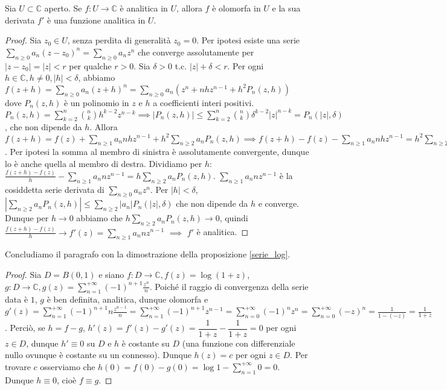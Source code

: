 \begin{thm}
  Sia $U \subset \mathbb{C}$ aperto. Se $f:U \longrightarrow \mathbb{C}$ è analitica in $U$, allora $f$ è olomorfa in $U$ e la sua derivata $f'$ è una funzione analitica in $U$.
\end{thm}

\begin{proof}
  Sia $z_0 \in U$, senza perdita di generalità $z_0=0$. Per ipotesi esiste una serie $\displaystyle \sum_{n \ge 0} a_n(z-z_0)^n=\sum_{n \ge 0} a_nz^n$ che converge assolutamente per $|z-z_0|=|z|<r$ per qualche $r>0$. Sia $\delta>0$ t.c. $|z|+\delta<r$.
  Per ogni $h \in \mathbb{C}, h\not=0, |h|<\delta$, abbiamo $\displaystyle f(z+h)=\sum_{n \ge 0} a_n(z+h)^n=\sum_{n \ge 0} a_n(z^n+nhz^{n-1}+h^2P_n(z, h))$ dove $P_n(z, h)$ è un polinomio in $z$ e $h$ a coefficienti interi positivi.
  $\displaystyle P_n(z, h)=\sum_{k=2}^n \binom{n}{k}h^{k-2}z^{n-k} \implies |P_n(z, h)| \le \sum_{k=2}^n \binom{n}{k} \delta^{k-2}|z|^{n-k}=P_n(|z|, \delta)$, che non dipende da $h$.
  Allora $\displaystyle f(z+h)=f(z)+\sum_{n \ge 1} a_nnhz^{n-1}+h^2\sum_{n \ge 2}a_nP_n(z, h) \implies f(z+h)-f(z)-\sum_{n \ge 1} a_nnhz^{n-1}=h^2\sum_{n \ge 2} a_nP_n(z, h)$. Per ipotesi la somma al membro di sinistra è assolutamente convergente, dunque lo è anche quella al membro di destra.
  Dividiamo per $h$: $\displaystyle \frac{f(z+h)-f(z)}{h}-\sum_{n \ge 1}a_nnz^{n-1}=h\sum_{n \ge 2} a_nP_n(z, h)$. $\displaystyle \sum_{n \ge 1}a_nnz^{n-1}$ è la cosiddetta serie derivata di $\displaystyle \sum_{n \ge 0}a_nz^n$.
  Per $|h|<\delta$, $\displaystyle \left|\sum_{n \ge 2} a_nP_n(z, h)\right| \le \sum_{n \ge 2} |a_n|P_n(|z|, \delta)$ che non dipende da $h$ e converge.
  Dunque per $h \longrightarrow 0$ abbiamo che $\displaystyle h\sum_{n \ge 2} a_nP_n(z, h) \longrightarrow 0$, quindi $\displaystyle \frac{f(z+h)-f(z)}{h} \longrightarrow f'(z)=\sum_{n \ge 1} a_nnz^{n-1}$ $\implies$ $f'$ è analitica.
\end{proof}

Concludiamo il paragrafo con la dimostrazione della proposizione \ref{serie_log}.

\begin{proof}
  Sia $D=B(0, 1)$ e siano $f:D \longrightarrow \mathbb{C}, f(z)=\log(1+z)$, $\displaystyle g:D \longrightarrow \mathbb{C}, g(z)=\sum_{n=1}^{+\infty} (-1)^{n+1}\frac{z^n}{n}$.
  Poiché il raggio di convergenza della serie data è $1$, $g$ è ben definita, analitica, dunque olomorfa e $\displaystyle g'(z)=\sum_{n=1}^{+\infty} (-1)^{n+1}n\frac{z^{n-1}}{n}=\sum_{n=1}^{+\infty} (-1)^{n+1}z^{n-1}=\sum_{n=0}^{+\infty} (-1)^nz^n=\sum_{n=0}^{+\infty} (-z)^n=\frac{1}{1-(-z)}=\frac{1}{1+z}$.
  Perciò, se $h=f-g$, $h'(z)=f'(z)-g'(z)=\dfrac{1}{1+z}-\dfrac{1}{1+z}=0$ per ogni $z \in D$, dunque $h' \equiv 0$ su $D$ e $h$ è costante su $D$ (una funzione con differenziale nullo ovunque è costante su un connesso). Dunque $h(z)=c$ per ogni $z \in D$.
  Per trovare $c$ osserviamo che $\displaystyle h(0)=f(0)-g(0)=\log{1}-\sum_{n=1}^{+\infty} 0=0$. Dunque $h \equiv 0$, cioè $f \equiv g$.
\end{proof}
